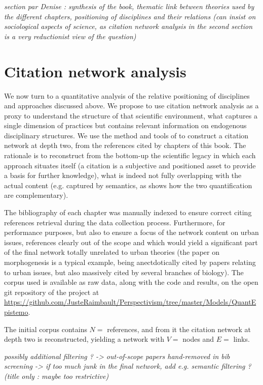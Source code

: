 \textit{section par Denise : synthesis of the book, thematic link between theories used by the different chapters, positioning of disciplines and their relations (can insist on sociological aspects of science, as citation network analysis in the second section is a very reductionist view of the question)}



\section{Citation network analysis}

We now turn to a quantitative analysis of the relative positioning of disciplines and approaches discussed above. We propose to use citation network analysis as a proxy to understand the structure of that scientific environment, what captures a single dimension of practices but contains relevant information on endogenous disciplinary structures. We use the method and tools of \cite{Raimbault2019} to construct a citation network at depth two, from the references cited by chapters of this book. The rationale is to reconstruct from the bottom-up the scientific legacy in which each approach situates itself (a citation is a subjective and positioned asset to provide a basis for further knowledge), what is indeed not fully overlapping with the actual content (e.g. captured by semantics, as \cite{banos2018spatialised} shows how the two quantification are complementary).


The bibliography of each chapter was manually indexed to ensure correct citing references retrieval during the data collection process. Furthermore, for performance purposes, but also to ensure a focus of the network content on urban issues, references clearly out of the scope and which would yield a significant part of the final network totally unrelated to urban theories (the paper on morphogenesis \cite{turing1990chemical} is a typical example, being anectdotically cited by papers relating to urban issues, but also massively cited by several branches of biology). The corpus used is available as raw data, along with the code and results, on the open git repository of the project at \url{https://github.com/JusteRaimbault/Perspectivism/tree/master/Models/QuantEpistemo}.


The initial corpus contains $N=$ references, and from it the citation network at depth two is reconstructed, yielding a network with $V=$ nodes and $E=$ links.


\textit{ possibly additional filtering ?
  -> out-of-scope papers hand-removed in bib screening
  -> if too much junk in the final network, add e.g. semantic filtering ? (title only : maybe too restrictive)
}


